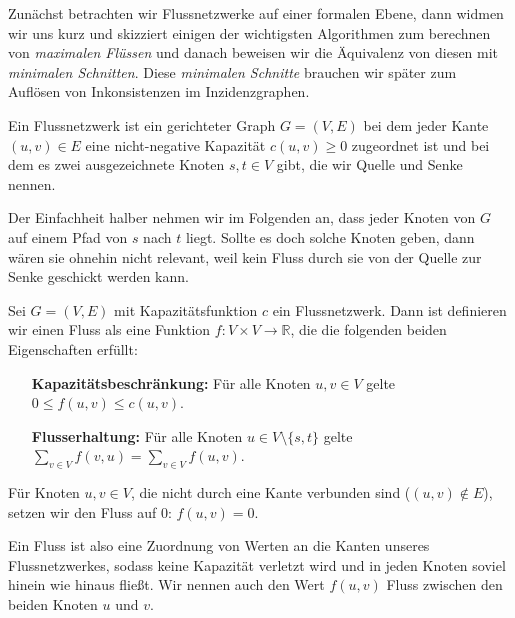 Zunächst betrachten wir Flussnetzwerke auf einer formalen Ebene, dann widmen wir uns kurz und skizziert einigen der wichtigsten Algorithmen zum berechnen von \emph{maximalen Flüssen} und danach beweisen wir die Äquivalenz von diesen mit \emph{minimalen Schnitten}. Diese \emph{minimalen Schnitte} brauchen wir später zum Auflösen von Inkonsistenzen im Inzidenzgraphen.

\begin{definition}[Flussnetzwerk]
	Ein Flussnetzwerk ist ein gerichteter Graph $G = (V,E)$ bei dem jeder Kante $(u,v) \in E$ eine nicht-negative Kapazität $c(u,v) \geq 0$ zugeordnet ist und bei dem es zwei ausgezeichnete Knoten $s, t \in V$ gibt, die wir Quelle und Senke nennen.  
\end{definition}

Der Einfachheit halber nehmen wir im Folgenden an, dass jeder Knoten von $G$ auf einem Pfad von $s$ nach $t$ liegt. Sollte es doch solche Knoten geben, dann wären sie ohnehin nicht relevant, weil kein Fluss durch sie von der Quelle zur Senke geschickt werden kann.

\begin{definition}[Fluss]
	Sei $G = (V,E)$ mit Kapazitätsfunktion $c$ ein Flussnetzwerk. Dann ist definieren wir einen Fluss als eine Funktion $f: V \times V \rightarrow \mathbb{R}$, die die folgenden beiden Eigenschaften erfüllt:
	\begin{itemize}[leftmargin=12em]
		\item[\textbf{Kapazitätsbeschränkung:}] Für alle Knoten $u,v \in V$ gelte $0 \leq f(u,v) \leq c(u,v)$.
		\item[\textbf{Flusserhaltung:}] Für alle Knoten $u \in V\setminus\{s,t\}$ gelte \\ 
			$\sum_{v \in V}{f(v,u)} = \sum_{v \in V}{f(u,v)}$.
	\end{itemize} 
	Für Knoten $u,v\in V$, die nicht durch eine Kante verbunden sind ($(u,v)\notin E$), setzen wir den Fluss auf 0: $f(u,v) = 0$.
\end{definition}

Ein Fluss ist also eine Zuordnung von Werten an die Kanten unseres Flussnetzwerkes, sodass keine Kapazität verletzt wird und in jeden Knoten soviel hinein wie hinaus fließt. Wir nennen auch den Wert $f(u,v)$ Fluss zwischen den beiden Knoten $u$ und $v$.


